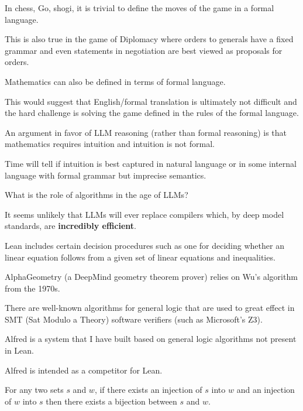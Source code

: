 {In chess, Go, shogi, it is trivial to define the moves of the game in a formal language.

\vfill
This is also true in the game of Diplomacy where orders to generals have a fixed grammar and even statements
in negotiation are best viewed as proposals for orders.

\vfill
Mathematics can also be defined in terms of formal language.

\vfill
This would suggest that English/formal translation is ultimately not difficult and the
hard challenge is solving the game defined in the rules of the formal language.


An argument in favor of LLM reasoning (rather than formal reasoning) is that mathematics requires intuition and intuition is not formal.

\vfill
Time will tell if intuition is best captured in natural language or in some internal language with formal grammar but imprecise semantics.


What is the role of algorithms in the age of LLMs?

\vfill
It seems unlikely that LLMs will ever replace compilers which, by deep model standards, are {\bf incredibly efficient}.

\vfill
Lean includes certain decision procedures such as one for deciding whether an linear equation
follows from a given set of linear equations and inequalities.

\vfill
AlphaGeometry (a DeepMind geometry theorem prover) relies on Wu's algorithm from the 1970s.


There are well-known algorithms for general logic that are used to great effect in SMT (Sat Modulo a Theory) software verifiers
(such as Microsoft's Z3).

\vfill
Alfred is a system that I have built based on general logic algorithms not present in Lean.

\vfill
Alfred is intended as a competitor for Lean.


For any two sets $s$ and $w$, if there exists an injection of $s$ into $w$ and an injection of $w$ into $s$ then there exists a bijection between $s$ and $w$.


}
